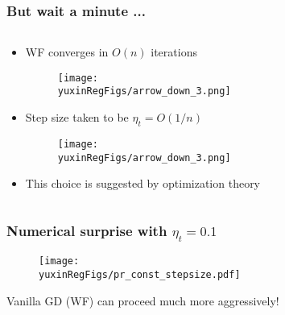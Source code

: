 \documentclass[compress,
mathserif,wide,%
]{beamer}
\newcommand{\yuxinRegFigs}{figure}
\begin{document}
\begin{frame}
	\frametitle{But wait a minute ...}

\begin{columns}

\begin{column}{0.92\textwidth}
\begin{itemize}
  \item[] WF converges in $O(n)$ iterations
  \pause

  \vspace{-1em}
  \begin{figure}
	\texttt{[image: \\yuxinRegFigs/arrow\_down\_3.png]} \qquad 
  \end{figure}

  \item[] Step size taken to be \alert{$\eta_t = O(1/n)$}

  \pause
  \vspace{-1em}
  \begin{figure}
	\texttt{[image: \\yuxinRegFigs/arrow\_down\_3.png]} \qquad 
  \end{figure}


  \item[] This choice is suggested by  optimization theory

  
\end{itemize}

\end{column}
\end{columns}

\end{frame}




\begin{frame}
	\frametitle{Numerical surprise with $\eta_t  = 0.1$}
\begin{figure}
	\centering
	\texttt{[image: \\yuxinRegFigs/pr\_const\_stepsize.pdf]}
\end{figure}

{

\begin{varblock}[\textwidth]{}
\begin{center}
  	Vanilla GD (WF) can proceed much more aggressively!
\end{center}
\end{varblock}
}


\end{frame}
\end{document}
